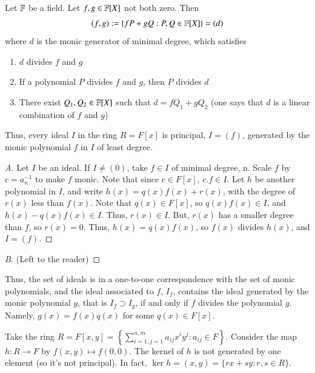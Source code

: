 \documentclass[12pt, a4paper, oneside, openright, titlepage]{book}
\begin{document}
\begin{cor}
    Let $\mathbb F$ be a field. Let $f,g \in \mathbb F[X]$ not both zero. Then \begin{equation}
        (f,g) := \{fP+gQ: P,Q\in\mathbb F[X]\} = (d)
    \end{equation}
    where $d$ is the monic generator of minimal degree, which satisfies \begin{enumerate}
        \item $d$ divides $f$ and $g$
        \item If a polynomial $P$ divides $f$ and $g$, then $P$ divides $d$
        \item There exist $Q_1, Q_2 \in \mathbb F[X]$ such that $d = fQ_1 + gQ_2$ (one says that $d$ is a linear combination of $f$ and $g$)
    \end{enumerate}
    Thus, every ideal $I$ in the ring $R = F[x]$ is principal, $I = (f)$, generated by the monic polynomial $f$ in $I$ of least degree.
    \begin{proof}[A]
        Let $I$ be an ideal. If $I \neq (0)$, take $f \in I$ of minimal degree, n. Scale $f$ by $c = a_n^{-1}$ to make $f$ monic. Note that since $c \in F[x]$, $c.f \in I$. Let $h$ be another polynomial in $I$, and write $h(x) = q(x)f(x) + r(x)$, with the degree of $r(x)$ less than $f(x)$. Note that $q(x) \in F[x]$, so $q(x)f(x) \in I$, and $h(x) - q(x)f(x) \in I$. Thus, $r(x) \in I$. But, $r(x)$ has a smaller degree than $f$, so $r(x) = 0$. Thus, $h(x) = q(x)f(x)$, so $f(x)$ divides $h(x)$, and $I = (f)$. 
    \end{proof}
    \begin{proof}[B]
        (Left to the reader)
    \end{proof}
\end{cor}

\begin{rmk}
        Thus, the set of ideals is in a one-to-one correspondence with the set of monic polynomials, and the ideal associated to $f$, $I_f$, contains the ideal generated by the monic polynomial $g$, that is $I_f \supset I_g$, if and only if $f$ divides the polynomial $g$. Namely, $g(x)=f(x)q(x)$ for some $q(x) \in F[x]$. 
\end{rmk}

\begin{eg}
        Take the ring $R = F[x,y] = \left\{\sum\limits_{i=1,j=1}^{n,m} a_{ij}x^iy^j:a_{ij} \in F\right\}$. Consider the map $h:R \rightarrow F$ by $f(x,y)\mapsto f(0,0)$. The kernel of $h$ is not generated by one element (so it's not principal). In fact, $\ker h = (x,y) = \{rx+sy:r,s \in R\}$.
\end{eg}
\end{document}
